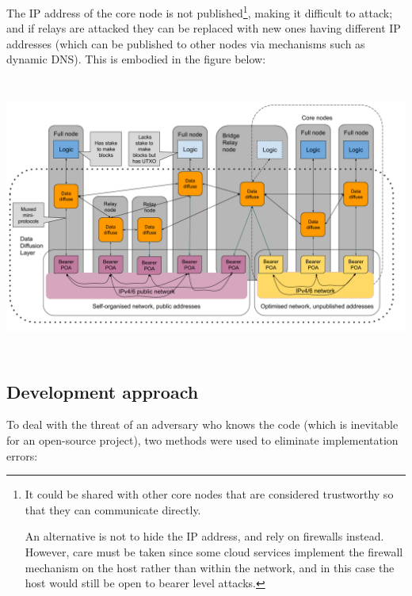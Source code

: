 \documentclass[11pt,a4paper]{article}
\begin{document}
The IP address of the core node is not published\footnote{It could be
  shared with other core nodes that are considered trustworthy so that
  they can communicate directly.

  An alternative is not to hide the IP address, and rely on firewalls
  instead. However, care must be taken since some cloud services
  implement the firewall mechanism on the host rather than within the
  network, and in this case the host would still be open to bearer level
  attacks.}, making it difficult to attack; and if relays are attacked
they can be replaced with new ones having different IP addresses (which
can be published to other nodes via mechanisms such as dynamic DNS).
This is embodied in the figure below:

\includegraphics[width=6.26772in,height=3.61111in]{./media/image5.png}

\subsection{Development approach}
\label{development-approach}

To deal with the threat of an adversary who knows the code (which is
inevitable for an open-source project), two methods were used to
eliminate implementation errors:
\end{document}
